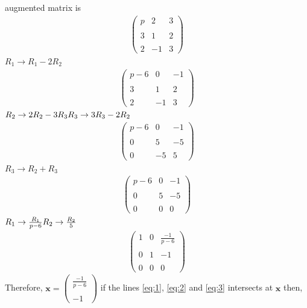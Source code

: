 \documentclass[12pt]{article}
\newcommand{\myvec}[1]{\ensuremath{\begin{pmatrix}#1\end{pmatrix}}}
\let\vec\mathbf
\begin{document}
augmented matrix is
\begin{align}
	\begin{pmatrix}
		p & 2 & 3 \\ \\
		3 & 1 & 2 \\ \\
		2 & -1 & 3
	\end{pmatrix}
\end{align}
$ R_1 \rightarrow R_1 - 2R_2 $
\begin{align}
	\begin{pmatrix}
		p-6 & 0 & -1 \\ \\
		3 & 1 & 2 \\ \\
		2 & -1 & 3
	\end{pmatrix}
\end{align}
$ R_2 \rightarrow 2R_2 - 3R_3\\ R_3 \rightarrow 3R_3 - 2R_2 $
\begin{align}
	\begin{pmatrix}
		p-6 & 0 & -1 \\ \\
		0 & 5 & -5 \\ \\
		0 & -5 & 5
	\end{pmatrix}
\end{align}
$ R_3 \rightarrow R_2 + R_3 $
\begin{align}
	\begin{pmatrix}
		p-6 & 0 & -1 \\ \\
		0 & 5 & -5 \\ \\
		0 & 0 & 0
	\end{pmatrix}
\end{align}
$ R_1 \rightarrow \frac{R_1}{p-6}\\ R_2 \rightarrow \frac{R_2}{5} $
\begin{align}
	\begin{pmatrix}
		1 & 0 & \frac{-1}{p-6} \\ \\
		0 & 1 & -1 \\ \\
		0 & 0 & 0
	\end{pmatrix}
\end{align}
Therefore, $ \vec{x} = \myvec{\frac{-1}{p-6} \\ \\ -1} $ if the lines \eqref{eq:1}, \eqref{eq:2} and \eqref{eq:3} intersects at $ \vec{x} $ then, \\
\end{document}
